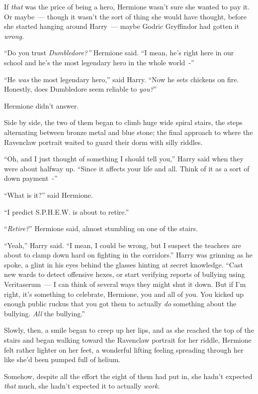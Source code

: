If \emph{that} was the price of being a hero, Hermione wasn't sure she wanted to pay it. Or maybe~--- though it wasn't the sort of thing she would have thought, before she started hanging around Harry~--- maybe Godric Gryffindor had gotten it \emph{wrong}.

``Do you trust \emph{Dumbledore?''} Hermione said. ``I mean, he's right here in our school and he's the most legendary hero in the whole world~-''

``He \emph{was} the most legendary hero,'' said Harry. ``Now he sets chickens on fire. Honestly, does Dumbledore seem reliable to \emph{you?}''

Hermione didn't answer.

Side by side, the two of them began to climb huge wide spiral stairs, the steps alternating between bronze metal and blue stone; the final approach to where the Ravenclaw portrait waited to guard their dorm with silly riddles.

``Oh, and I just thought of something I should tell you,'' Harry said when they were about halfway up. ``Since it affects your life and all. Think of it as a sort of down payment~-''

``What is it?'' said Hermione.

``I predict S.P.H.E.W. is about to retire.''

``\emph{Retire?}'' Hermione said, almost stumbling on one of the stairs.

``Yeah,'' Harry said. ``I mean, I could be wrong, but I suspect the teachers are about to clamp down hard on fighting in the corridors.'' Harry was grinning as he spoke, a glint in his eyes behind the glasses hinting at secret knowledge. ``Cast new wards to detect offensive hexes, or start verifying reports of bullying using Veritaserum~--- I can think of several ways they might shut it down. But if I'm right, it's something to celebrate, Hermione, you and all of you. You kicked up enough public ruckus that you got them to actually \emph{do} something about the bullying. \emph{All} the bullying.''

Slowly, then, a smile began to creep up her lips, and as she reached the top of the stairs and began walking toward the Ravenclaw portrait for her riddle, Hermione felt rather lighter on her feet, a wonderful lifting feeling spreading through her like she'd been pumped full of helium.

Somehow, despite all the effort the eight of them had put in, she hadn't expected \emph{that} much, she hadn't expected it to actually \emph{work}.

